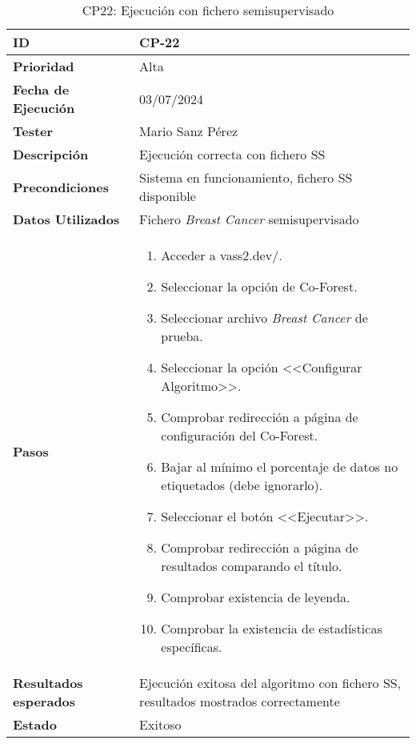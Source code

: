 \begin{table}[ht]
	\centering
	\renewcommand{\arraystretch}{1.5} %
	\begin{tabular}{>{\raggedright\arraybackslash}p{4cm} p{9.5cm}}
    \hline
    \rowcolor{gray!20}
    \textbf{ID} & CP-22\\
    \hline
    \rowcolor{white}
    \textbf{Prioridad} & Alta \\
    \hline
    \rowcolor{gray!20}
    \textbf{Fecha de Ejecución} & 03/07/2024 \\
    \hline
    \rowcolor{white}
    \textbf{Tester} & Mario Sanz Pérez \\
    \hline
    \rowcolor{gray!20}
    \textbf{Descripción} & Ejecución correcta con fichero SS\\
    \hline
    \rowcolor{white}
    \textbf{Precondiciones} & Sistema en funcionamiento, fichero SS disponible\\
    \hline
    \rowcolor{white}
    \textbf{Datos Utilizados} & Fichero \textit{Breast Cancer} semisupervisado \\
    \hline
    \rowcolor{gray!20}
    \textbf{Pasos} & \begin{enumerate}
        \item Acceder a vass2.dev/.
        \item Seleccionar la opción de Co-Forest.
        \item Seleccionar archivo \textit{Breast Cancer} de prueba.
        \item Seleccionar la opción <<Configurar Algoritmo>>.
        \item Comprobar redirección a página de configuración del Co-Forest.
        \item Bajar al mínimo el porcentaje de datos no etiquetados (debe ignorarlo).
        \item Seleccionar el botón <<Ejecutar>>.
        \item Comprobar redirección a página de resultados comparando el título.
        \item Comprobar existencia de leyenda.
        \item Comprobar la existencia de estadísticas específicas.
    \end{enumerate}\\
	\hline
    \rowcolor{gray!20}
    \textbf{Resultados esperados} & Ejecución exitosa del algoritmo con fichero SS, resultados mostrados correctamente\\
    \hline
    \rowcolor{white}
    \textbf{Estado} & Exitoso\\
    \hline
	\end{tabular}
	\caption[CP22: Ejecución con fichero SS]{CP22: Ejecución con fichero semisupervisado}
	
\end{table}

